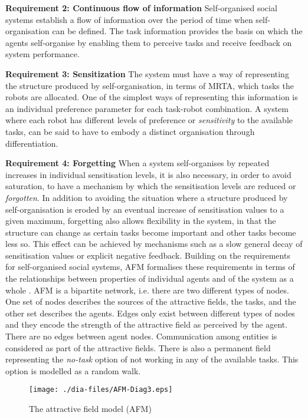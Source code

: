 \textbf{Requirement 2: Continuous flow of information} Self-organised social systems establish a flow of information over the period of time when self-organisation can be defined.  The task information provides the basis on which the agents self-organise by enabling them to perceive tasks and receive feedback on system performance.

\textbf{Requirement 3: Sensitization} The system must have a way of representing the structure produced by self-organisation, in terms of MRTA, which tasks the robots are allocated.  One of the simplest ways of representing this information is an individual preference parameter for each task-robot combination.  A system where each robot has different levels of preference or {\em sensitivity} to the available tasks, can be said to have to embody a distinct organisation through differentiation.

\textbf{Requirement 4: Forgetting} When a system self-organises by repeated increases in individual sensitisation levels, it is also necessary, in order to avoid saturation, to have a mechanism by which the sensitisation levels are reduced or {\em forgotten}.  In addition to avoiding the situation where a structure produced by self-organisation is eroded by an eventual increase of sensitisation values to a given maximum, forgetting also allows flexibility in the system, in that the structure can change as certain tasks become important and other tasks become less so.  This effect can be achieved by mechanisms such as a slow general decay of sensitisation values or explicit negative feedback.
Building on the requirements for self-organised social systems, AFM formalises these requirements in terms of the relationships between properties of individual agents and of the system as a whole \cite{Arcaute+2008}.  AFM is a bipartite network, i.e. there are two different types of nodes.  One set of nodes describes the sources of the attractive fields, the tasks, and the other set describes the agents.  Edges only exist between different types of nodes and they encode the strength of the attractive field as perceived by the agent.  There are no edges between agent nodes.  Communication among entities is considered as part of the attractive fields.  There is also a permanent field representing the {\em no-task} option of not working in any of the available tasks. This option is modelled as a random walk. 
\begin{figure}[H]
\centering
\texttt{[image: ./dia-files/AFM-Diag3.eps]}
\caption{The attractive field model (AFM)}
\label{fig:afm} %
\end{figure}

